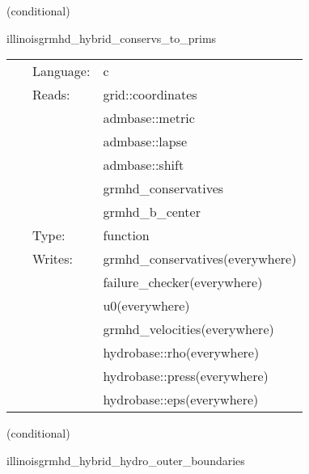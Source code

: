 \vspace{5mm}

   (conditional) 

\hspace{5mm} illinoisgrmhd\_hybrid\_conservs\_to\_prims 

\hspace{5mm}{\it hybrid version of illinoisgrmhd\_conservs\_to\_prims } 


\hspace{5mm}

 \begin{tabular*}{160mm}{cll} 
~ & Language:  & c \\ 
~ & Reads:  & grid::coordinates \\ 
~& ~ &admbase::metric\\ 
~& ~ &admbase::lapse\\ 
~& ~ &admbase::shift\\ 
~& ~ &grmhd\_conservatives\\ 
~& ~ &grmhd\_b\_center\\ 
~ & Type:  & function \\ 
~ & Writes:  & grmhd\_conservatives(everywhere) \\ 
~& ~ &failure\_checker(everywhere)\\ 
~& ~ &u0(everywhere)\\ 
~& ~ &grmhd\_velocities(everywhere)\\ 
~& ~ &hydrobase::rho(everywhere)\\ 
~& ~ &hydrobase::press(everywhere)\\ 
~& ~ &hydrobase::eps(everywhere)\\ 
\end{tabular*} 


\vspace{5mm}

   (conditional) 

\hspace{5mm} illinoisgrmhd\_hybrid\_hydro\_outer\_boundaries 

\hspace{5mm}{\it hybrid version of illinoisgrmhd\_outer\_boundaries } 


\hspace{5mm}

